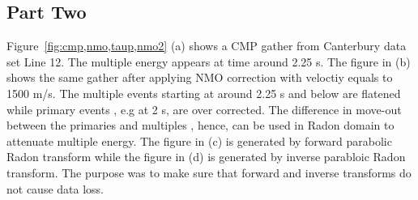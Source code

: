 \subsection{Part Two}




Figure~\ref{fig:cmp,nmo,taup,nmo2} (a) shows a CMP gather from Canterbury data set Line 12. The multiple energy appears at time around 2.25 s. The figure in (b)  shows the same gather after applying NMO correction with veloctiy equals to 1500 m/s. The multiple events starting at around 2.25 s and below are flatened while primary events , e.g at 2 s,  are over corrected. The difference in move-out between the primaries and multiples , hence, can be used in Radon domain to attenuate multiple energy.
The figure in (c) is generated by forward parabolic Radon transform while the figure in (d) is generated by inverse parabloic Radon transform. The purpose was to make sure that forward and inverse transforms do not cause data loss.
